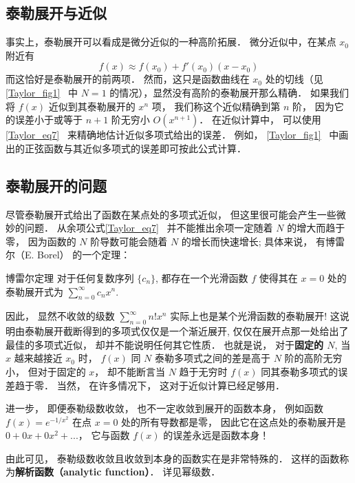 

\subsection{泰勒展开与近似}
事实上，泰勒展开可以看成是微分近似的一种高阶拓展． 微分近似中，在某点 $x_0$ 附近有
\begin{equation}
f(x) \approx f(x_0) + f'(x_0)(x - x_0)
\end{equation}
而这恰好是泰勒展开的前两项． 然而，这只是函数曲线在 $x_0$ 处的切线（见\autoref{Taylor_fig1}~ 中 $N=1$ 的情况），显然没有高阶的泰勒展开那么精确． 如果我们将 $f(x)$ 近似到其泰勒展开的 $x^n$ 项， 我们称这个近似精确到第 $n$ 阶， 因为它的误差小于或等于 $n + 1$ 阶无穷小 $O(x^{n + 1})$． 在近似计算中， 可以使用\autoref{Taylor_eq7}~ 来精确地估计近似多项式给出的误差． 例如， \autoref{Taylor_fig1}~ 中画出的正弦函数与其近似多项式的误差即可按此公式计算．

\subsection{泰勒展开的问题}
尽管泰勒展开式给出了函数在某点处的多项式近似， 但这里很可能会产生一些微妙的问题． 从余项公式\autoref{Taylor_eq7}~ 并不能推出余项一定随着 $N$ 的增大而趋于零， 因为函数的 $N$ 阶导数可能会随着 $N$ 的增长而快速增长; 具体来说， 有博雷尔（E. Borel） 的一个定理：
\begin{theorem}{博雷尔定理}
对于任何复数序列 $\{c_n\}$, 都存在一个光滑函数 $f$ 使得其在 $x=0$ 处的泰勒展开式为 $\sum_{n=0}^\infty c_nx^n$.
\end{theorem}
因此， 显然不收敛的级数 $\sum_{n=0}^\infty n!x^n$ 实际上也是某个光滑函数的泰勒展开! 这说明由泰勒展开截断得到的多项式仅仅是一个渐近展开, 仅仅在展开点那一处给出了最佳的多项式近似， 却并不能说明任何其它性质． 也就是说， 对于\textbf{固定的 $N$}, 当 $x$ 越来越接近 $x_0$ 时， $f(x)$ 同 $N$ 泰勒多项式之间的差是高于 $N$ 阶的高阶无穷小， 但对于固定的 $x$， 却不能断言当 $N$ 趋于无穷时 $f(x)$ 同其泰勒多项式的误差趋于零． 当然， 在许多情况下， 这对于近似计算已经足够用．

进一步， 即便泰勒级数收敛， 也不一定收敛到展开的函数本身， 例如函数 $f(x)=e^{-1/x^2}$ 在点 $x=0$ 处的所有导数都是零， 因此它在这点处的泰勒展开是 $0+0x+0x^2+...$， 它与函数 $f(x)$ 的误差永远是函数本身！

由此可见， 泰勒级数收敛且收敛到本身的函数实在是非常特殊的． 这样的函数称为\textbf{解析函数（analytic function）}． 详见幂级数．
